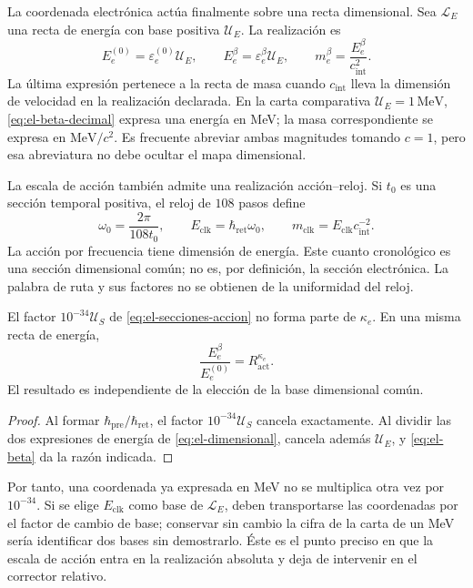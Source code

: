 La coordenada electrónica actúa finalmente sobre una recta dimensional.
Sea \(\mathcal L_E\) una recta de energía con base positiva
\(\mathcal U_E\). La realización es
\begin{equation}
 E_e^{(0)}=\varepsilon_e^{(0)}\mathcal U_E,\qquad
 E_e^\beta=\varepsilon_e^\beta\mathcal U_E,
 \qquad m_e^\beta=\frac{E_e^\beta}{c_{\mathrm{int}}^2}.
 \label{eq:el-dimensional}
\end{equation}
La última expresión pertenece a la recta de masa cuando
\(c_{\mathrm{int}}\) lleva la dimensión de velocidad en la realización
declarada. En la carta comparativa \(\mathcal U_E=1\,\mathrm{MeV}\),
\eqref{eq:el-beta-decimal} expresa una energía en MeV; la masa
correspondiente se expresa en \(\mathrm{MeV}/c^2\). Es frecuente
abreviar ambas magnitudes tomando \(c=1\), pero esa abreviatura no
debe ocultar el mapa dimensional.

La escala de acción también admite una realización acción--reloj. Si
\(t_0\) es una sección temporal positiva, el reloj de \(108\) pasos
define
\begin{equation}
 \omega_0=\frac{2\pi}{108t_0},\qquad
 E_{\mathrm{clk}}=\hbar_{\mathrm{ret}}\omega_0,\qquad
 m_{\mathrm{clk}}=E_{\mathrm{clk}}c_{\mathrm{int}}^{-2}.
 \label{eq:el-cuanto-reloj}
\end{equation}
La acción por frecuencia tiene dimensión de energía. Este cuanto
cronológico es una sección dimensional común; no es, por definición,
la sección electrónica. La palabra de ruta y sus factores no se
obtienen de la uniformidad del reloj.

\begin{proposition}
El factor \(10^{-34}\mathcal U_S\) de
\eqref{eq:el-secciones-accion} no forma parte de \(\kappa_e\). En
una misma recta de energía,
\begin{equation}
 \frac{E_e^\beta}{E_e^{(0)}}=R_{\mathrm{act}}^{\kappa_e}.
 \label{eq:el-razon-energia}
\end{equation}
El resultado es independiente de la elección de la base dimensional
común.
\end{proposition}
\begin{proof}
Al formar \(\hbar_{\mathrm{pre}}/\hbar_{\mathrm{ret}}\), el factor
\(10^{-34}\mathcal U_S\) cancela exactamente. Al dividir las dos
expresiones de energía de \eqref{eq:el-dimensional}, cancela además
\(\mathcal U_E\), y \eqref{eq:el-beta} da la razón indicada.
\end{proof}

Por tanto, una coordenada ya expresada en MeV no se multiplica otra vez
por \(10^{-34}\). Si se elige \(E_{\mathrm{clk}}\) como base de
\(\mathcal L_E\), deben transportarse las coordenadas por el factor
de cambio de base; conservar sin cambio la cifra de la carta de un MeV
sería identificar dos bases sin demostrarlo. Éste es el punto preciso
en que la escala de acción entra en la realización absoluta y deja de
intervenir en el corrector relativo.

